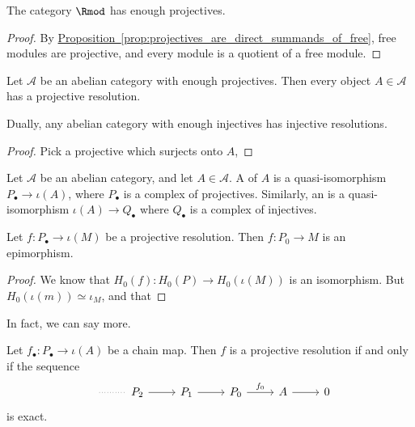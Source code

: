 \documentclass[main.tex]{subfiles}
\begin{document}
\begin{corollary}
  The category $\Rmod$ has enough projectives.
\end{corollary}
\begin{proof}
  By \hyperref[prop:projectives_are_direct_summands_of_free]{Proposition~\ref*{prop:projectives_are_direct_summands_of_free}}, free modules are projective, and every module is a quotient of a free module.
\end{proof}

\begin{proposition}
  Let $\mathcal{A}$ be an abelian category with enough projectives. Then every object $A \in \mathcal{A}$ has a projective resolution.

  Dually, any abelian category with enough injectives has injective resolutions.
\end{proposition}
\begin{proof}
  Pick a projective which surjects onto $A$,
\end{proof}

\begin{definition}
  \label{def:projective_injective_resolution}
  Let $\mathcal{A}$ be an abelian category, and let $A \in \mathcal{A}$. A  of $A$ is a quasi-isomorphism $P_{\bullet} \to \iota(A)$, where $P_{\bullet}$ is a complex of projectives. Similarly, an  is a quasi-isomorphism $\iota(A) \to Q_{\bullet}$ where $Q_{\bullet}$ is a complex of injectives.
\end{definition}

\begin{lemma}
  \label{lemma:projective_resolution_epimorphism}
  Let $f\colon P_{\bullet} \to \iota(M)$ be a projective resolution. Then $f\colon P_{0} \to M$ is an epimorphism.
\end{lemma}
\begin{proof}
  We know that $H_{0}(f)\colon H_{0}(P) \to H_{0}(\iota (M))$ is an isomorphism. But $H_{0}(\iota(m)) \simeq \iota_{M}$, and that
\end{proof}

In fact, we can say more.

\begin{lemma}
  \label{lemma:equivalent_characterization_of_projective_resolution}
  Let $f_{\bullet}\colon P_{\bullet} \to \iota(A)$ be a chain map. Then $f$ is a projective resolution if and only if the sequence
  \begin{equation*}
    \begin{tikzcd}
      \
      \arrow[r, dotted, no head]
      & P_{2}
      \arrow[r]
      & P_{1}
      \arrow[r]
      & P_{0}
      \arrow[r, "f_{0}"]
      & A
      \arrow[r]
      & 0
    \end{tikzcd}
  \end{equation*}
  is exact.
\end{lemma}
\end{document}
